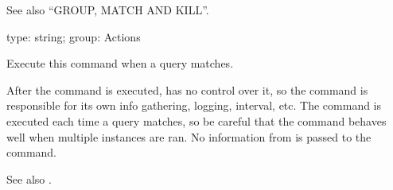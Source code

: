 \documentclass[letterpaper,10pt,english]{sphinxmanual}
\begin{document}
\sphinxAtStartPar
See also “GROUP, MATCH AND KILL”.

\begin{fulllineitems}
\label{\detokenize{mariadb-kill:cmdoption-mariadb-kill-execute-command}}
\sphinxAtStartPar
type: string; group: Actions

\sphinxAtStartPar
Execute this command when a query matches.

\sphinxAtStartPar
After the command is executed,  has no control over it, so the command
is responsible for its own info gathering, logging, interval, etc.  The
command is executed each time a query matches, so be careful that the command
behaves well when multiple instances are ran.  No information from  is
passed to the command.

\sphinxAtStartPar
See also {\hyperref[\detokenize{mariadb-kill:cmdoption-mariadb-kill-wait-before-kill}]{}}.

\end{fulllineitems}

\end{document}
